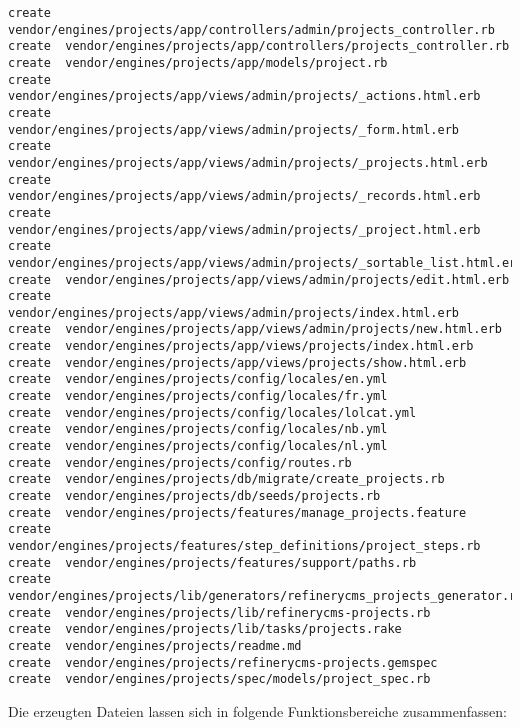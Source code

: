 \begin{lstlisting}[label=sec.refineryoutput,caption=Erzeugte Dateien des Refinery Engine Generators]
create  vendor/engines/projects/app/controllers/admin/projects_controller.rb
create  vendor/engines/projects/app/controllers/projects_controller.rb
create  vendor/engines/projects/app/models/project.rb
create  vendor/engines/projects/app/views/admin/projects/_actions.html.erb
create  vendor/engines/projects/app/views/admin/projects/_form.html.erb
create  vendor/engines/projects/app/views/admin/projects/_projects.html.erb
create  vendor/engines/projects/app/views/admin/projects/_records.html.erb
create  vendor/engines/projects/app/views/admin/projects/_project.html.erb
create  vendor/engines/projects/app/views/admin/projects/_sortable_list.html.erb
create  vendor/engines/projects/app/views/admin/projects/edit.html.erb
create  vendor/engines/projects/app/views/admin/projects/index.html.erb
create  vendor/engines/projects/app/views/admin/projects/new.html.erb
create  vendor/engines/projects/app/views/projects/index.html.erb
create  vendor/engines/projects/app/views/projects/show.html.erb
create  vendor/engines/projects/config/locales/en.yml
create  vendor/engines/projects/config/locales/fr.yml
create  vendor/engines/projects/config/locales/lolcat.yml
create  vendor/engines/projects/config/locales/nb.yml
create  vendor/engines/projects/config/locales/nl.yml
create  vendor/engines/projects/config/routes.rb
create  vendor/engines/projects/db/migrate/create_projects.rb
create  vendor/engines/projects/db/seeds/projects.rb
create  vendor/engines/projects/features/manage_projects.feature
create  vendor/engines/projects/features/step_definitions/project_steps.rb
create  vendor/engines/projects/features/support/paths.rb
create  vendor/engines/projects/lib/generators/refinerycms_projects_generator.rb
create  vendor/engines/projects/lib/refinerycms-projects.rb
create  vendor/engines/projects/lib/tasks/projects.rake
create  vendor/engines/projects/readme.md
create  vendor/engines/projects/refinerycms-projects.gemspec
create  vendor/engines/projects/spec/models/project_spec.rb
\end{lstlisting}


Die erzeugten Dateien lassen sich in folgende Funktionsbereiche zusammenfassen:


